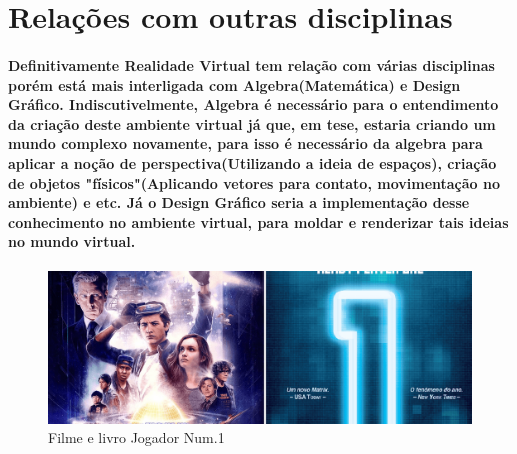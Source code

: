 \documentclass{paper}
\begin{document}
\section{Relações com outras disciplinas}
\paragraph{       Definitivamente Realidade Virtual tem relação com várias disciplinas porém está mais interligada com Algebra(Matemática) e Design Gráfico. Indiscutivelmente, Algebra é necessário para o entendimento da criação deste ambiente virtual já que, em tese, estaria criando um mundo complexo novamente, para isso é necessário da algebra para aplicar a noção de perspectiva(Utilizando a ideia de espaços), criação de objetos "físicos"(Aplicando vetores para contato, movimentação no ambiente) e etc. Já o Design Gráfico seria a implementação desse conhecimento no ambiente virtual, para moldar e renderizar tais ideias no mundo virtual.}
\begin{figure}[h!]
\centering
\includegraphics[scale=0.24]{Jogador.png}
\caption{Filme e livro Jogador Num.1\cite{Fonte3}}
\end{figure}



\end{document}
